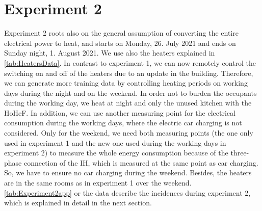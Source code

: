 \section{Experiment 2}
\label{sec:Experiment2}
Experiment 2 roots also on the general assumption of converting the entire electrical power to heat, and starts on Monday, 26. July 2021 and ends on Sunday night, 1. August 2021. We use also the heaters explained in \autoref{tab:HeatersData}. In contrast to experiment 1, we can now remotely control the switching on and off of the heaters due to an update in the building. Therefore, we can generate more training data by controlling heating periods on working days during the night and on the weekend. In order not to burden the occupants during the working day, we heat at night and only the unused kitchen with the HoHeF. In addition, we can use another measuring point for the electrical consumption during the working days, where the electric car charging is not considered. Only for the weekend, we need both measuring points (the one only used in experiment 1 and the new one used during the working days in experiment 2) to measure the whole energy consumption because of the three-phase connection of the IH, which is measured at the same point as car charging. So, we have to ensure no car charging during the weekend. Besides, the heaters are in the same rooms as in experiment 1 over the weekend. \autoref{tab:Experiment2app} or the data describe the incidences during experiment 2, which is explained in detail in the next section. 

